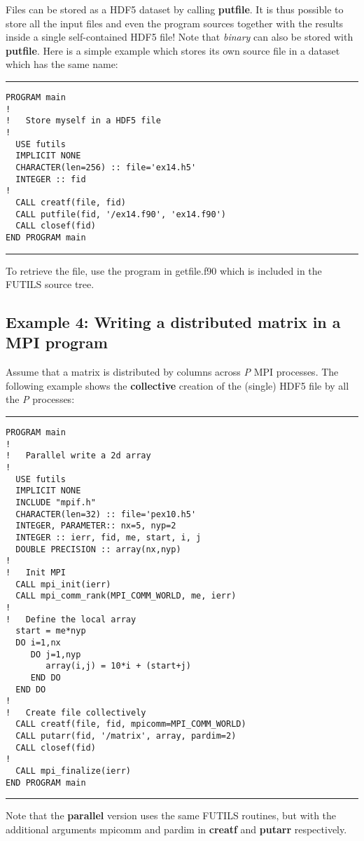 \documentclass[a4paper]{article}
\begin{document}
Files can be stored as a HDF5 dataset by calling {\bfseries putfile}. It is thus
possible to store all the input files and even the program sources together with
the results inside a single self-contained HDF5 file! Note that {\itshape binary\/}
can also be stored with {\bfseries putfile}. Here is a simple example which stores
its own source file in a dataset which has the same name:
\par
\addvspace{\medskipamount}
\nopagebreak\hrule
\begin{verbatim}
PROGRAM main
!
!   Store myself in a HDF5 file
!
  USE futils
  IMPLICIT NONE
  CHARACTER(len=256) :: file='ex14.h5'
  INTEGER :: fid
!
  CALL creatf(file, fid)
  CALL putfile(fid, '/ex14.f90', 'ex14.f90')
  CALL closef(fid)
END PROGRAM main
\end{verbatim}
\nopagebreak\hrule
\addvspace{\medskipamount}

To retrieve the file, use the program in {\ttfamily getfile.f90} which is included
in the FUTILS source tree.




\subsection{Example 4: Writing a distributed matrix in a MPI program}

Assume that a matrix is distributed by columns across {\itshape P\/} MPI
processes. The following example shows the {\bfseries collective} creation of the
(single) HDF5 file by all the {\itshape P\/} processes:
\par
\addvspace{\medskipamount}
\nopagebreak\hrule
\begin{verbatim}
PROGRAM main
!
!   Parallel write a 2d array
!
  USE futils
  IMPLICIT NONE
  INCLUDE "mpif.h"
  CHARACTER(len=32) :: file='pex10.h5'
  INTEGER, PARAMETER:: nx=5, nyp=2
  INTEGER :: ierr, fid, me, start, i, j
  DOUBLE PRECISION :: array(nx,nyp)
!
!   Init MPI
  CALL mpi_init(ierr)
  CALL mpi_comm_rank(MPI_COMM_WORLD, me, ierr)
!
!   Define the local array
  start = me*nyp
  DO i=1,nx
     DO j=1,nyp
        array(i,j) = 10*i + (start+j)
     END DO
  END DO
!
!   Create file collectively
  CALL creatf(file, fid, mpicomm=MPI_COMM_WORLD)
  CALL putarr(fid, '/matrix', array, pardim=2)
  CALL closef(fid)
!
  CALL mpi_finalize(ierr)
END PROGRAM main
\end{verbatim}
\nopagebreak\hrule
\addvspace{\medskipamount}

Note that the {\bfseries parallel} version uses the same FUTILS routines, but
with the additional arguments {\ttfamily mpicomm} and {\ttfamily pardim}
in {\bfseries creatf} and {\bfseries putarr} respectively.
\end{document}
